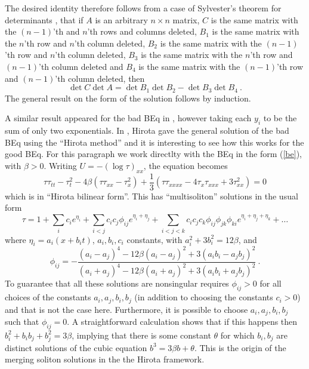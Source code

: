 \documentclass[12pt]{article}
\begin{document}
The desired identity therefore follows from a case of Sylvester's theorem for determinants \cite{g}, that 
if $A$ is an arbitrary $n\times n$ matrix, 
$C$ is the same matrix with the $(n-1)$'th and $n$'th rows and columns deleted,
$B_1$ is the same matrix with the  $n$'th row and $n$'th column deleted,
$B_2$ is the same matrix with the $(n-1)$'th row and $n$'th column deleted,
$B_3$ is the same matrix with the  $n$'th row and $(n-1)$'th column deleted and 
$B_4$ is the same matrix with the $(n-1)$'th row and $(n-1)$'th column deleted, then 
$$ \det C \det A = \det B_1 \det B_2 - \det B_3 \det B_4 \ .  $$ 
The general result on the form of the solution follows by induction.  


A similar result appeared for the bad BEq in \cite{beq20}, however taking each $y_i$ to be the sum of only two exponentials. 
In \cite{beq34}, Hirota gave the general solution of the bad BEq using the ``Hirota method'' and it is interesting to see
how this works for the good BEq. For this paragraph we work directlty with the BEq in the form (\ref{be}), with
$\beta>0$. Writing $U = - (\log \tau)_{xx}$, the equation becomes
$$
\tau \tau_{tt} - \tau_t^2 - 4 \beta \left(\tau \tau_{xx} - \tau_x^2 \right)
+ \frac13\left(\tau \tau_{xxxx} - 4 \tau_{x}\tau_{xxx} + 3\tau_{xx}^2\right)
= 0 
$$
which is in ``Hirota bilinear form''. This has ``multisoliton'' solutions in the usual form 
$$\tau = 1 + \sum_i c_ie^{\eta_i} + \sum_{i<j} c_ic_j\phi_{ij} e^{\eta_i+\eta_j}
   + \sum_{i<j<k} c_ic_jc_k \phi_{ij}\phi_{jk}\phi_{ki} e^{\eta_i+\eta_j+\eta_k} + \ldots $$
where $\eta_i = a_i(x+b_it)$, $a_i,b_i,c_i$ constants, with $a_i^2 + 3b_i^2 = 12\beta$, and
$$ \phi_{ij} = - 
\frac{(a_i-a_j)^4 -12\beta(a_i-a_j)^2 + 3(a_ib_i-a_jb_j)^2}{(a_i+a_j)^4 -12\beta(a_i+a_j)^2 + 3(a_ib_i+a_jb_j)^2}\ . 
$$
To guarantee that all these solutions are nonsingular requires $\phi_{ij}>0$ for all choices of the constants
$a_i,a_j,b_i,b_j$ (in addition to choosing the constants $c_i>0$) 
and that is not the case here. Furthermore, it is possible to choose $a_i,a_j,b_i,b_j$ such
that $\phi_{ij}=0$. A straightforward calculation shows that if this happens then
$b_i^2 + b_ib_j + b_j^2 = 3\beta$, implying that there is some constant $\theta$ for which
$b_i,b_j$ are distinct solutions of the cubic equation $b^3 = 3\beta b + \theta$. This is the
origin of the merging soliton solutions in the the Hirota framework. 
\end{document}
